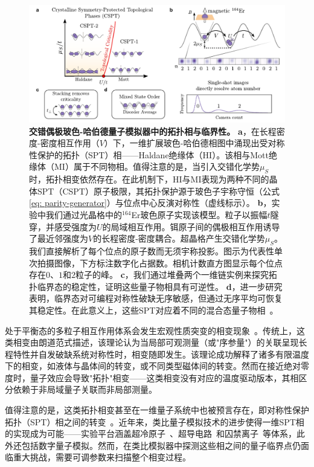 \documentclass[preprint,superscriptaddress,floatfix, nofootinbib]{revtex4-2}
\begin{document}
\begin{figure}
    \centering
    \includegraphics[width=\textwidth]{figures/Fig_intro_v4.pdf}
    \caption{\textbf{交错偶极玻色-哈伯德量子模拟器中的拓扑相与临界性。}
    \textbf{a}，在长程密度-密度相互作用（$V$）下，一维扩展玻色-哈伯德相图\cite{Torre2006, Berg2008}中涌现出受对称性保护的拓扑（SPT）相——Haldane绝缘体（HI）。该相与Mott绝缘体（MI）属于不同物相。值得注意的是，当引入交错化学势$\mu_S$时，拓扑相变依然存在。在此机制下，HI与MI表现为两种不同的晶体SPT（CSPT）原子极限，其拓扑保护源于玻色子宇称守恒（公式\eqref{eq: parity-generator}）与位点中心反演对称性（虚线标示）\cite{Fuji2015}。
    \textbf{b}，实验中我们通过光晶格中的$^{164}$Er玻色原子实现该模型。粒子以振幅$t$隧穿，并感受强度为$U$的局域相互作用。铒原子间的偶极相互作用诱导了最近邻强度为$V$的长程密度-密度耦合。超晶格产生交错化学势$\mu_S$。我们直接解析了每个位点的原子数而无须宇称投影。图示为代表性单次拍摄图像，下方标注数字化占据数。相机计数直方图显示每个位点存在$0$、$1$和$2$粒子的峰。
    \textbf{c}，我们通过堆叠两个一维链实例来探究拓扑临界态的稳定性，证明这些量子物相具有可逆性。
    \textbf{d}，进一步研究表明，临界态对可编程对称性破缺无序敏感，但通过无序平均可恢复其稳定性。在此意义上，这些SPT对应着不同的混合态量子物相~\cite{Ma2023}。
    }
    \label{fig: setup}
\end{figure}

处于平衡态的多粒子相互作用体系会发生宏观性质突变的相变现象~\cite{Sachdev1999}。传统上，这类相变由朗道范式描述，该理论认为当局部可观测量（或"序参量"）的关联呈现长程特性并自发破缺系统对称性时，相变随即发生。该理论成功解释了诸多有限温度下的相变，如液体与晶体间的转变，或不同类型磁体间的转变。然而在接近绝对零度时，量子效应会导致"拓扑"相变——这类相变没有对应的温度驱动版本，其相区分依赖于非局域量子关联而非局部测量。

值得注意的是，这类拓扑相变甚至在一维量子系统中也被预言存在，即对称性保护拓扑（SPT）相之间的转变~\cite{Senthil2015, Pollmann2010, Turner11, Fidkowski11, Pollmann2012, Schuch2011, Chen2011, Chen2012}。近年来，类比量子模拟技术的进步使得一维SPT相的实现成为可能——实验平台涵盖超冷原子~\cite{Atala2013, Meier2016, Sylvain2019, Sompet2022}、超导电路~\cite{Cai2019}和囚禁离子~\cite{Katz2024}等体系，此外还包括数字量子模拟\cite{Choo2018, Smith2022, Herrmann2022}。然而，在类比模拟器中探测这些相之间的量子临界点仍面临重大挑战，需要可调参数来扫描整个相变过程。
\end{document}
